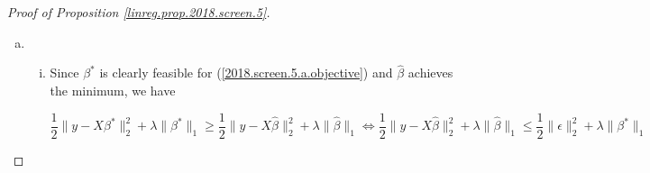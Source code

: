 \begin{proof}[Proof of Proposition \ref{linreg.prop.2018.screen.5}]
\begin{enumerate}[(a)]
\begin{enumerate}[(i)]
\item \textbf{Necessarily unique.} The dual problem (\ref{2018.screen.5.a.dual.ans}) is strictly concave, so the value \(\hat{u}\) that maximizes it is unique.



\item \textbf{Necessarily unique} (except in the trivial case \(\lambda=0\)). Per part 5(b)(iv), \(\lVert \hat{\beta} \rVert_1\) is unique. (\ref{2018.screen.5.a.objective}) is convex, so the minimum \(\frac{1}{2} \lVert y - X \hat{\beta} \rVert_2^2 + \lambda \lVert \hat{\beta} \rVert_1\) is unique. Therefore \( \lVert y - X \hat{\beta} \rVert_2^2\) must be unique.

\textbf{Jacob's solution:} Since \(\hat{u}\) is unique and by (\ref{2018.screen.5.a.other.part.result}) \(\hat{u} = y - X \hat{\beta}\), we must have that \(\lVert \hat{u} \rVert = \lVert y - X \hat{\beta} \rVert\) is unique.


\item \textbf{Necessarily unique} (except in the trivial case \(\lambda=0\)). This is immediate from Proposition \ref{linreg.2018.screen.5.b.iv.prop}.


\end{enumerate}

\item 

\begin{enumerate}[(i)]

\item Since \(\beta^*\) is clearly feasible for (\ref{2018.screen.5.a.objective}) and \(\hat{\beta}\) achieves the minimum, we have

\[
\frac{1}{2} \lVert y - X \beta^* \rVert_2^2 + \lambda \lVert \beta^* \rVert_1 \geq \frac{1}{2} \lVert y - X \hat{\beta} \rVert_2^2 + \lambda \lVert \hat{\beta} \rVert_1 \iff  \frac{1}{2} \lVert y - X \hat{\beta} \rVert_2^2 + \lambda \lVert \hat{\beta} \rVert_1 \leq \frac{1}{2} \lVert\epsilon \rVert_2^2 + \lambda \lVert \beta^* \rVert_1
\]



\end{enumerate}
\end{enumerate}
\end{proof}
